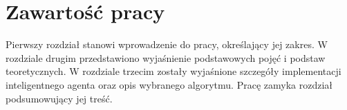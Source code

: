 \section{Zawartość pracy}
\label{sec:zawartoscpracy}

Pierwszy rozdział stanowi wprowadzenie do pracy, określający jej zakres. W rozdziale drugim 
przedstawiono wyjaśnienie podstawowych pojęć i podstaw teoretycznych. W rozdziale trzecim zostały wyjaśnione szczegóły 
implementacji inteligentnego agenta oraz opis wybranego algorytmu. Pracę zamyka rozdział podsumowujący jej treść.





